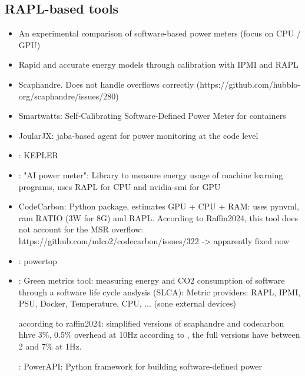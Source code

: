 \subsection{RAPL-based tools}
\label{sec:rapltools}
\begin{itemize}
    \item \parencite{jay2023experimental} An experimental comparison of software-based power meters (focus on CPU / GPU)
    \item \parencite{kavanagh2019rapid} Rapid and accurate energy models through calibration with IPMI and RAPL
    \item \parencite{scaphandre_documentation} Scaphandre. Does not handle overflows correctly (https://github.com/hubblo-org/scaphandre/issues/280)
    \item \parencite{fieni2020smartwatts} Smartwatts: Self-Calibrating Software-Defined Power Meter for containers
    \item \parencite{joularjx} JoularJX: jaba-based agent for power monitoring at the code level
    \item \parencite{kepler_energy}: KEPLER
    \item \parencite{aipowermeter}: "AI power meter": Library to measure energy usage of machine learning programs, uses RAPL for CPU and nvidia-smi for GPU
    \item \parencite{codecarbon} CodeCarbon: Python package, estimates GPU + CPU + RAM: uses pynvml, ram RATIO (3W for 8G) and RAPL. According to Raffin2024, this tool does not account for the MSR overflow: https://github.com/mlco2/codecarbon/issues/322 -> apparently fixed now
    \item \parencite{powertop}: powertop
    \item \parencite{greencodingdocs}: Green metrics tool: measuring energy and CO2 consumption of software through a software life cycle anslysis (SLCA): Metric providers: RAPL, IPMI, PSU, Docker, Temperature, CPU, ... (sone external devices)
    
    according to raffin2024: simplified versions of scaphandre and codecarbon hhve 3\%, 0.5\% overhead at 10Hz
    according to \parencite{jay2023experimental}, the full versions have between 2 and 7\% at 1Hz.

\parencite{fieni2024powerapi}: PowerAPI: Python framework for building software-defined power
\end{itemize}

